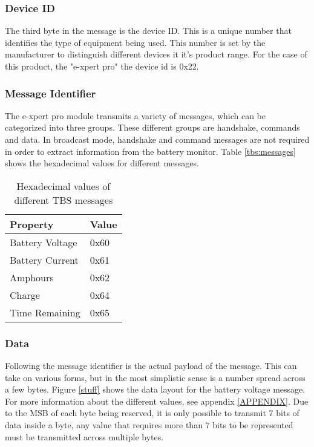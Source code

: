 \subsubsection{Device ID}

The third byte in the message is the device ID. This is a unique number that identifies the type of equipment being used. This number is set by the manufacturer to distinguish different devices it it's product range. For the case of this product, the "e-xpert pro" the device id is 0x22.

\subsubsection{Message Identifier}

The e-xpert pro module transmits a variety of messages, which can be categorized into three groups. These different groups are handshake, commands and data. In broadcast mode, handshake and command messages are not required in order to extract information from the battery monitor. Table \ref{tbs:messages} shows the hexadecimal values for different messages.

\begin{table}
\begin{center}
    \begin{tabular}{|l|l|}
        \hline
        Property & Value \\ \hline
        Battery Voltage   & 0x60 \\
        Battery Current    & 0x61    \\ 
        Amphours    & 0x62    \\ 
        Charge       &  0x64 \\ 
        Time Remaining & 0x65 \\
        \hline
    \end{tabular}
	\caption{Hexadecimal values of different TBS messages}
	\label{tab:tbsmessages}
\end{center}
\end{table}

\subsubsection{Data}

Following the message identifier is the actual payload of the message. This can take on various forms, but in the most simplistic sense is a number spread across a few bytes. Figure \ref{stuff} shows the data layout for the battery voltage message. For more information about the different values, see appendix \ref{APPENDIX}.  Due to the MSB of each byte being reserved, it is only possible to transmit 7 bits of data inside a byte, any value that requires more than 7 bits to be represented must be transmitted across multiple bytes.  


